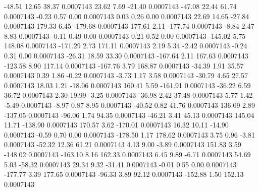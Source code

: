       -48.51       12.65       38.37     0.0007143
       23.62        7.69      -21.40     0.0007143
      -47.08       22.44       61.74     0.0007143
       -0.23        0.57        0.00     0.0007143
        0.03        0.26        0.00     0.0007143
       22.69       14.65      -27.84     0.0007143
      179.33        6.45     -179.68     0.0007143
      177.61        2.11     -177.74     0.0007143
       -8.84        2.47        8.83     0.0007143
       -0.11        0.49        0.00     0.0007143
        0.21        0.52        0.00     0.0007143
     -145.02        5.75      148.08     0.0007143
     -171.29        2.73      171.11     0.0007143
        2.19        5.34       -2.42     0.0007143
       -0.24        0.31        0.00     0.0007143
      -26.31       18.59       33.30     0.0007143
     -167.64        2.11      167.63     0.0007143
     -123.58        8.90      117.14     0.0007143
     -167.76        3.79      168.87     0.0007143
      -34.39        1.91       35.57     0.0007143
        0.39        1.86       -0.22     0.0007143
       -3.73        1.17        3.58     0.0007143
      -30.79        4.65       27.57     0.0007143
       18.03        1.21      -18.06     0.0007143
      160.41        5.59     -161.91     0.0007143
      -36.22        6.59       36.72     0.0007143
        2.30       19.99       -3.25     0.0007143
      -36.98        2.42       37.48     0.0007143
        5.77        1.42       -5.49     0.0007143
       -8.97        0.87        8.95     0.0007143
      -40.52        0.82       41.76     0.0007143
      136.09        2.89     -137.05     0.0007143
      -96.06        1.74       94.35     0.0007143
      -46.21        3.41       45.13     0.0007143
      145.04       11.71     -138.90     0.0007143
      170.57        3.62     -170.01     0.0007143
       16.32       10.11      -14.90     0.0007143
       -0.59        0.70        0.00     0.0007143
     -178.50        1.17      178.62     0.0007143
        3.75        0.96       -3.81     0.0007143
      -52.32       12.36       61.21     0.0007143
        4.13        9.00       -3.89     0.0007143
      151.83        3.59     -148.02     0.0007143
     -163.10        8.16      162.33     0.0007143
        6.45        9.89       -6.71     0.0007143
       54.69        5.03      -58.32     0.0007143
       29.34        9.32      -31.41     0.0007143
       -0.01        0.55        0.00     0.0007143
     -177.77        3.39      177.65     0.0007143
      -96.33        3.89       92.12     0.0007143
     -152.88        1.50      152.13     0.0007143
